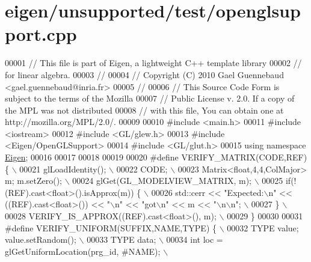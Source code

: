 \hypertarget{eigen_2unsupported_2test_2openglsupport_8cpp_source}{}\section{eigen/unsupported/test/openglsupport.cpp}
\label{eigen_2unsupported_2test_2openglsupport_8cpp_source}

\begin{DoxyCode}
00001 \textcolor{comment}{// This file is part of Eigen, a lightweight C++ template library}
00002 \textcolor{comment}{// for linear algebra.}
00003 \textcolor{comment}{//}
00004 \textcolor{comment}{// Copyright (C) 2010 Gael Guennebaud <gael.guennebaud@inria.fr>}
00005 \textcolor{comment}{//}
00006 \textcolor{comment}{// This Source Code Form is subject to the terms of the Mozilla}
00007 \textcolor{comment}{// Public License v. 2.0. If a copy of the MPL was not distributed}
00008 \textcolor{comment}{// with this file, You can obtain one at http://mozilla.org/MPL/2.0/.}
00009 
00010 \textcolor{preprocessor}{#include <main.h>}
00011 \textcolor{preprocessor}{#include <iostream>}
00012 \textcolor{preprocessor}{#include <GL/glew.h>}
00013 \textcolor{preprocessor}{#include <Eigen/OpenGLSupport>}
00014 \textcolor{preprocessor}{#include <GL/glut.h>}
00015 \textcolor{keyword}{using namespace }\hyperlink{namespace_eigen}{Eigen};
00016 
00017 
00018 
00019 
00020 \textcolor{preprocessor}{#define VERIFY\_MATRIX(CODE,REF) \{ \(\backslash\)}
00021 \textcolor{preprocessor}{    glLoadIdentity(); \(\backslash\)}
00022 \textcolor{preprocessor}{    CODE; \(\backslash\)}
00023 \textcolor{preprocessor}{    Matrix<float,4,4,ColMajor> m; m.setZero(); \(\backslash\)}
00024 \textcolor{preprocessor}{    glGet(GL\_MODELVIEW\_MATRIX, m); \(\backslash\)}
00025 \textcolor{preprocessor}{    if(!(REF).cast<float>().isApprox(m)) \{ \(\backslash\)}
00026 \textcolor{preprocessor}{      std::cerr << "Expected:\(\backslash\)n" << ((REF).cast<float>()) << "\(\backslash\)n" << "got\(\backslash\)n" << m << "\(\backslash\)n\(\backslash\)n"; \(\backslash\)}
00027 \textcolor{preprocessor}{    \} \(\backslash\)}
00028 \textcolor{preprocessor}{    VERIFY\_IS\_APPROX((REF).cast<float>(), m); \(\backslash\)}
00029 \textcolor{preprocessor}{  \}}
00030 
00031 \textcolor{preprocessor}{#define VERIFY\_UNIFORM(SUFFIX,NAME,TYPE) \{ \(\backslash\)}
00032 \textcolor{preprocessor}{    TYPE value; value.setRandom(); \(\backslash\)}
00033 \textcolor{preprocessor}{    TYPE data; \(\backslash\)}
00034 \textcolor{preprocessor}{    int loc = glGetUniformLocation(prg\_id, #NAME); \(\backslash\)}

\end{DoxyCode}

